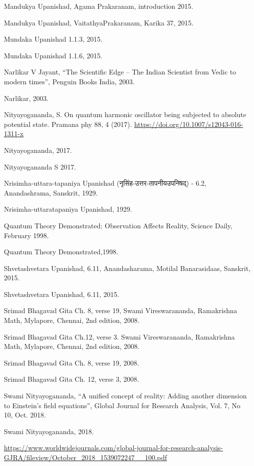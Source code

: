 \documentclass[twoside, 13pt]{article}
\begin{document}
{{{\begin{thebibliography}{99}
\bibitem{} Mandukya Upanishad, Agama Prakaranam, introduction 2015.

\bibitem{} Mandukya Upanishad, VaitathyaPrakaranam, Karika 37, 2015.

\bibitem{} Mundaka Upanishad 1.1.3, 2015.

\bibitem{} Mundaka Upanishad 1.1.6, 2015.

\bibitem{} Narlikar V Jayant, “The Scientific Edge – The Indian Scientist from Vedic to modern times”, Penguin Books India, 2003.

\bibitem{} Narlikar, 2003.

\bibitem{} Nityayogananda, S. On quantum harmonic oscillator being subjected to absolute potential state. Pramana phy 88, 4 (2017). \url{https://doi.org/10.1007/s12043-016-1311-x}

\bibitem{} Nityayogananda, 2017.

\bibitem{} Nityayogananda S 2017.

\bibitem{} Nrisimha-uttara-tapaniya Upanishad (\foreignlanguage{hindi}{{\fontsize{9}{11}\selectfont नृसिंह-उत्तर-तापनीयउपनिषद्}}) - 6.2, Anandashrama, Sanskrit, 1929.

\bibitem{} Nrisimha-uttaratapaniya Upanishad, 1929.

\bibitem{} Quantum Theory Demonstrated: Observation Affects Reality, Science Daily, February 1998.

\bibitem{} Quantum Theory Demonstrated,1998.

\bibitem{} Shvetashvetara Upanishad, 6.11, Anandasharama, Motilal Banarasidaas, Sanskrit, 2015.

\bibitem{} Shvetashvetara Upanishad, 6.11, 2015.

\bibitem{} Srimad Bhagavad Gita Ch. 8, verse 19, Swami Vireswarananda, Ramakrishna Math, Mylapore, Chennai, 2nd edition, 2008.

\bibitem{} Srimad Bhagavad Gita Ch.12, verse 3. Swami Vireswarananda, Ramakrishna Math, Mylapore, Chennai, 2nd edition, 2008.

\bibitem{} Srimad Bhagavad Gita Ch. 8, verse 19, 2008.

\bibitem{} Srimad Bhagavad Gita Ch. 12, verse 3, 2008.

\bibitem{} Swami Nityayogananda, “A unified concept of reality: Adding another dimension to Einstein’s field equations”, Global Journal for Research Analysis, Vol. 7, No 10, Oct. 2018.

\bibitem{} Swami Nityayogananda, 2018.

\url{https://www.worldwidejournals.com/global-journal-for-research-analysis-GJRA/fileview/October_2018_1539072247__100.pdf}


\end{thebibliography}}}}
\end{document}
